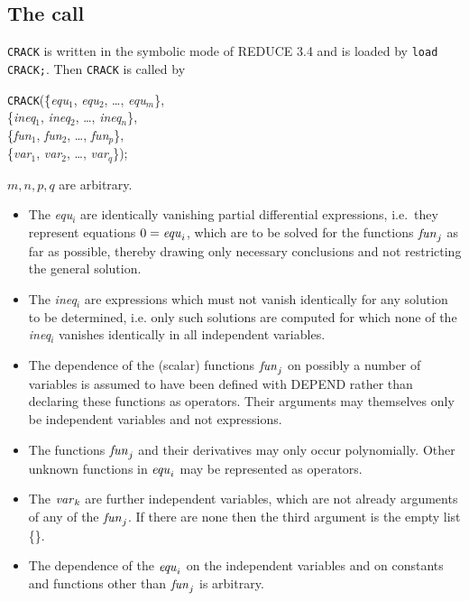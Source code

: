\subsection{The call}
{\tt CRACK} is written in the symbolic mode of REDUCE 3.4 and is loaded by
{\tt load CRACK;}. Then {\tt CRACK} is called by
\begin{tabbing}
  {\tt CRACK}(\=\{{\it equ}$_1$, {\it equ}$_2$, \ldots , {\it equ}$_m$\},  \\
              \>\{{\it ineq}$_1$, {\it ineq}$_2$, \ldots , {\it ineq}$_n$\}, \\
              \>\{{\it fun}$_1$, {\it fun}$_2$, \ldots , {\it fun}$_p$\},  \\
              \>\{{\it var}$_1$, {\it var}$_2$, \ldots , {\it var}$_q$\});
\end{tabbing}     
        $m,n,p,q$ are arbitrary.
\begin{itemize}
\item
The {\it equ}$_i$ are identically vanishing partial differential expressions, 
i.e.\
they represent equations  $0 = {\it equ}_i$, which are to be solved for the 
functions ${\it fun}_j$ as far as possible, thereby drawing only necessary
conclusions and not restricting the general solution.
\item
The {\it ineq}$_i$ are expressions which must not vanish identically for
any solution to be determined, i.e. only such solutions are computed for which
none of the {\it ineq}$_i$ vanishes identically in all independent variables.
\item
The dependence of the (scalar) functions ${\it fun}_j$ on possibly a number of 
variables is assumed to have been defined with DEPEND rather than
declaring these functions 
as operators. Their arguments may  themselves only be independent variables
and not expressions.
\item
The functions ${\it fun}_j$ and their derivatives may only occur polynomially.
Other unknown functions in ${\it equ}_i$ may be represented as operators.
\item
The ${\it var}_k$ are further independent variables, which are not
already arguments  
of any of the ${\it fun}_j$. If there are none then the third argument is 
the empty list \{\}.
\item 
The dependence of the ${\it equ}_i$ on the independent variables and on
constants and functions other than ${\it fun}_j$ is arbitrary.
\end{itemize}

